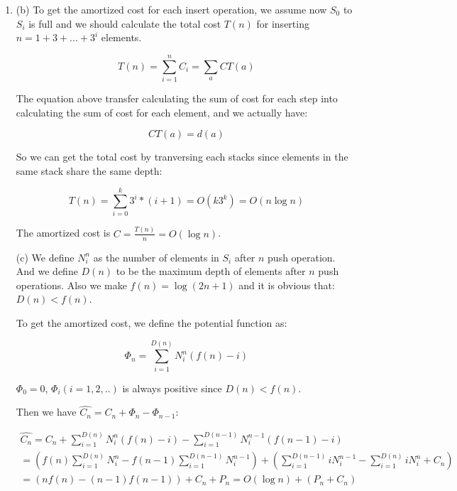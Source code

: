 \documentclass[12pt,a4paper]{article}
\makeatletter
\newtheorem*{solution}{Solution}
\theoremstyle{definition}
\renewenvironment{solution}[1][Solution] {\par\pushQED{\qed}\normalfont\topsep6\p@\@plus6\p@\relax\trivlist\item[\hskip\labelsep\bfseries#1\@addpunct{.}]\ignorespaces}{\popQED\endtrivlist\@endpefalse} \makeatother
\makeatother
\begin{document}
\begin{enumerate}
\begin{solution}
	 (b) To get the amortized cost for each insert operation, we assume now $S_0$ to $S_i$ is full and we should calculate the total cost $T(n)$ for inserting $n = 1+3+...+3^i$ elements.
	 
	 \begin{equation*}
		 T(n) = \sum_{i=1}^{n}C_i = \sum_{a} CT(a)
	 \end{equation*}

	 The equation above transfer calculating the sum of cost for each step into calculating 
	 the sum of cost for each element, and we actually have:

	 \begin{equation*}
		CT(a) = d(a)
	\end{equation*}

	 So we can get the total cost by tranversing each stacks since elements in the same stack share the same depth:
	
	\begin{equation*}
       T(n) = \sum_{i = 0}^{k} 3^{i} * (i+1) =  O(k3^k) = O(n\log n)
	\end{equation*}
	
	The amortized cost is $C = \frac{T(n)}{n} = O(\log n)$.

	 
   (c) We define $N_{i}^{n}$ as the number of elements in $S_i$ after $n$ push operation. And we define $D(n)$ to be the maximum depth of elements after $n$ push operations.
   Also we make $f(n) = \log (2n+1)$ and it is obvious that:
	   $D(n) < f(n)$.

	   To get the amortized cost, we define the potential function as:

	   \begin{equation*}
		   \Phi_n = \sum_{i=1}^{D(n)}N_{i}^{n}(f(n) - i)
	   \end{equation*}

	   $\Phi_0 = 0$, $\Phi_i(i=1, 2, ..)$ is always positive since $D(n) < f(n)$. 

	   Then we have $\hat{C_n} = C_n + \Phi_n - \Phi_{n - 1}$:

	   \begin{gather*}
		\hat{C_n} = C_n + \sum_{i=1}^{D(n)}N_{i}^{n}(f(n) - i) - \sum_{i=1}^{D(n-1)}N_{i}^{n-1}(f(n-1) - i)\\
				= (f(n)\sum_{i=1}^{D(n)}N_{i}^{n} - f(n-1)\sum_{i=1}^{D(n-1)}N_{i}^{n-1}) + (\sum_{i=1}^{D(n-1)}iN_{i}^{n-1} - \sum_{i=1}^{D(n)}iN_{i}^{n} + C_n)\\
				= (nf(n) - (n-1)f(n-1)) + C_n + P_n = O(\log n) + (P_n + C_n) \\
	   \end{gather*}


\end{solution}
\end{enumerate}
\end{document}
